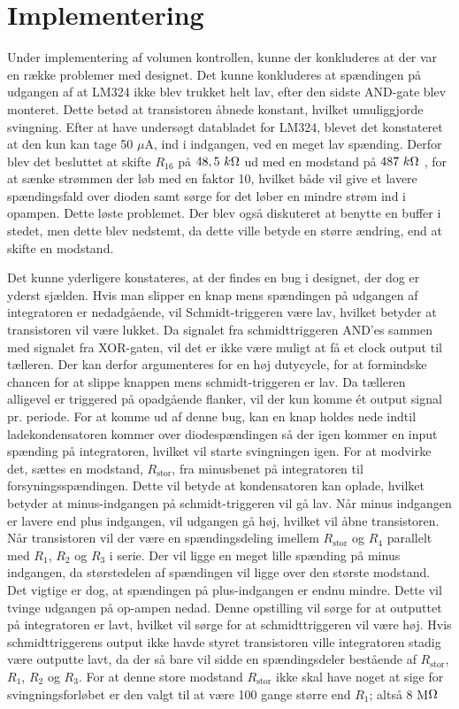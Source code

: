 \section{Implementering}
Under implementering af volumen kontrollen, kunne der konkluderes at der var en række problemer med designet. Det kunne konkluderes at spændingen på udgangen af at LM324 ikke blev trukket helt lav, efter den sidste AND-gate blev monteret. Dette betød at transistoren åbnede konstant, hvilket umuliggjorde svingning. Efter at have undersøgt databladet for LM324, blevet det konstateret at den kun kan tage 50 $\mu$A, ind i indgangen, ved en meget lav spænding. Derfor blev det besluttet at skifte $R_{16}$ på $48,5~k\ohm$ ud med en modstand på $487~k\ohm$ , for at sænke strømmen der løb med en faktor 10, hvilket både vil give et lavere spændingsfald over dioden samt sørge for det løber en mindre strøm ind i opampen. Dette løste problemet. Der blev også diskuteret at benytte en buffer i stedet, men dette blev nedstemt, da dette ville betyde en større ændring, end at skifte en modstand.

Det kunne yderligere konstateres, at der findes en bug i designet, der dog er yderst sjælden. Hvis man slipper en knap mens spændingen på udgangen af integratoren er nedadgående, vil Schmidt-triggeren være lav, hvilket betyder at transistoren vil være lukket. Da signalet fra schmidttriggeren AND'es sammen med signalet fra XOR-gaten, vil det er ikke være muligt at få et clock output til tælleren. Der kan derfor argumenteres for en høj dutycycle, for at formindske chancen for at slippe knappen mens schmidt-triggeren er lav. Da tælleren alligevel er triggered på opadgående flanker, vil der kun komme ét output signal pr. periode. For at komme ud af denne bug, kan en knap holdes nede indtil ladekondensatoren kommer over diodespændingen så der igen kommer en input spænding på integratoren, hvilket vil starte svingningen igen. 
For at modvirke det, sættes en modstand, $R_{\mathrm{stor}}$, fra minusbenet på integratoren til forsyningsspændingen. Dette vil betyde at kondensatoren kan oplade, hvilket betyder at minus-indgangen på schmidt-triggeren vil gå lav. Når minus indgangen er lavere end plus indgangen, vil udgangen gå høj, hvilket vil åbne transistoren. Når transistoren vil der være en spændingsdeling imellem $R_{\mathrm{stor}}$ og $R_4$ parallelt med $R_1$, $R_2$ og $R_3$ i serie. Der vil ligge en meget lille spænding på minus indgangen, da størstedelen af spændingen vil ligge over den største modstand. Det vigtige er dog, at spændingen på plus-indgangen er endnu mindre. Dette vil tvinge udgangen på op-ampen nedad. Denne opstilling vil sørge for at outputtet på integratoren er lavt, hvilket vil sørge for at schmidttriggeren vil være høj. Hvis schmidttriggerens output ikke havde styret transistoren ville integratoren stadig være outputte lavt, da der så bare vil sidde en spændingsdeler bestående af $R_{\mathrm{stor}}$, $R_1$, $R_2$ og $R_3$.
For at denne store modstand $R_{\mathrm{stor}}$ ikke skal have noget at sige for svingningsforløbet er den valgt til at være 100 gange større end $R_1$; altså 8 M$\ohm$